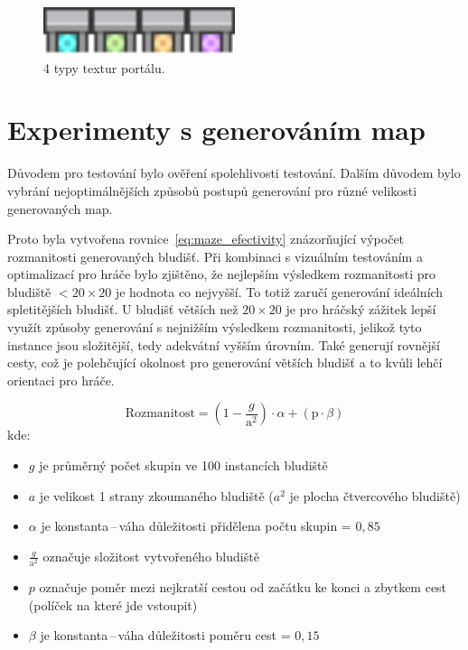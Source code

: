\begin{figure}[H]
    \centering
    \includegraphics[width=0.5\textwidth]{obrazky-figures/ch4/Portal.png}
    \caption{4 typy textur portálu.}
    \label{fig:portal}
\end{figure}

\newpage
\section{Experimenty s generováním map}\label{chap:Experimenty s generováním map}
Důvodem pro testování bylo ověření spolehlivosti testování. Dalším důvodem bylo vybrání nejoptimálnějších způsobů postupů generování pro různé velikosti generovaných map. 

Proto byla vytvořena rovnice~\ref{eq:maze_efectivity} znázorňující výpočet rozmanitosti generovaných bludišť. Při kombinaci s vizuálním testováním a optimalizací pro hráče bylo zjištěno, že nejlepším výsledkem rozmanitosti pro bludiště $<20 \times 20$ je hodnota co nejvyšší. To totiž zaručí generování ideálních spletitějších bludišť. U bludišť větších než $20 \times 20$ je pro hráčský zážitek lepší využít způsoby generování s nejnižším výsledkem rozmanitosti, jelikož tyto instance jsou složitější, tedy adekvátní vyšším úrovním. Také generují rovnější cesty, což je polehčující okolnost pro generování větších bludišť a to kvůli lehčí orientaci pro hráče.

\vspace{0.5cm}
\begin{equation}
    \text{Rozmanitost} = \left(1 - \frac{g}{\text{a}^2}\right) \cdot \alpha + \left(\text{p} \cdot \beta \right)
    \label{eq:maze_efectivity}
\end{equation}
\vspace{0.5cm}
\noindent kde: 
\begin{itemize}
    \item $g$ je průměrný počet skupin ve 100 instancích bludiště
    \item $a$ je velikost 1 strany zkoumaného bludiště ($a^2$ je plocha čtvercového bludiště)
    \item $\alpha$ je konstanta\,--\,váha důležitosti přidělena počtu skupin = $0,85$
    \item $\frac{g}{\text{a}^2}$ označuje složitost vytvořeného bludiště
    \item $p$ označuje poměr mezi nejkratší cestou od začátku ke konci a zbytkem cest (políček na které jde vstoupit)
    \item $\beta$ je konstanta\,--\,váha důležitosti poměru cest = $0,15$
\end{itemize}

